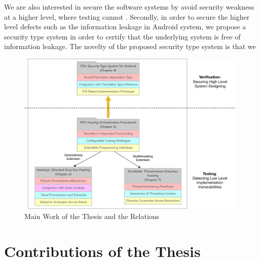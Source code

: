 We are also interested in secure the software systems by avoid security weakness at a higher level, where testing cannot . Secondly, in order to secure the higher level defects such as the information leakage in Android system, we propose a security type system in order to certify that the underlying system is free of information leakage. The novelty of the proposed security type system is that we 

\begin{figure}[ht]
	\begin{center}
		\includegraphics[width=0.98\textwidth]{res/contributions}
		\caption{Main Work of the Thesis and the Relations}
		\label{fig:works}
	\end{center}
\end{figure}

\section{Contributions of the Thesis}



